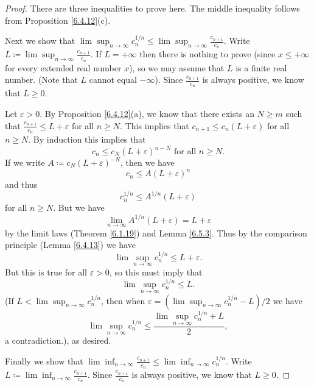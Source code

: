 \begin{proof}
    There are three inequalities to prove here.
    The middle inequality follows from Proposition \ref{6.4.12}(c).

    Next we show that \(\lim\sup_{n \to \infty} c_n^{1 / n} \leq \lim\sup_{n \to \infty} \frac{c_{n + 1}}{c_n}\).
    Write \(L \coloneqq \lim\sup_{n \to \infty} \frac{c_{n + 1}}{c_n}\).
    If \(L = +\infty\) then there is nothing to prove (since \(x \leq +\infty\) for every extended real number \(x\)), so we may assume that \(L\) is a finite real number.
    (Note that \(L\) cannot equal \(-\infty\)).
    Since \(\frac{c_{n + 1}}{c_n}\) is always positive, we know that \(L \geq 0\).

    Let \(\varepsilon > 0\).
    By Proposition \ref{6.4.12}(a), we know that there exists an \(N \geq m\) such that \(\frac{c_{n + 1}}{c_n} \leq L + \varepsilon\) for all \(n \geq N\).
    This implies that \(c_{n + 1} \leq c_n (L + \varepsilon)\) for all \(n \geq N\).
    By induction this implies that
    \[
        c_n \leq c_N (L + \varepsilon)^{n - N} \text{ for all } n \geq N.
    \]
    If we write \(A \coloneqq c_N (L + \varepsilon)^{-N}\), then we have
    \[
        c_n \leq A(L + \varepsilon)^n
    \]
    and thus
    \[
        c_n^{1 / n} \leq A^{1 / n} (L + \varepsilon)
    \]
    for all \(n \geq N\).
    But we have
    \[
        \lim_{n \to \infty} A^{1 / n} (L + \varepsilon) = L + \varepsilon
    \]
    by the limit laws (Theorem \ref{6.1.19}) and Lemma \ref{6.5.3}.
    Thus by the comparison principle (Lemma \ref{6.4.13}) we have
    \[
        \lim\sup_{n \to \infty} c_n^{1 / n} \leq L + \varepsilon.
    \]
    But this is true for all \(\varepsilon > 0\), so this must imply that
    \[
        \lim\sup_{n \to \infty} c_n^{1 / n} \leq L.
    \]
    (If \(L < \lim\sup_{n \to \infty} c_n^{1 / n}\), then when \(\varepsilon = (\lim\sup_{n \to \infty} c_n^{1 / n} - L) / 2\) we have
    \[
        \lim\sup_{n \to \infty} c_n^{1 / n} \leq \frac{\lim\sup_{n \to \infty} c_n^{1 / n} + L}{2},
    \]
    a contradiction.), as desired.

    Finally we show that \(\lim\inf_{n \to \infty} \frac{c_{n + 1}}{c_n} \leq \lim\inf_{n \to \infty} c_n^{1 / n}\).
    Write \(L \coloneqq \lim\inf_{n \to \infty} \frac{c_{n + 1}}{c_n}\).
    Since \(\frac{c_{n + 1}}{c_n}\) is always positive, we know that \(L \geq 0\).


\end{proof}
